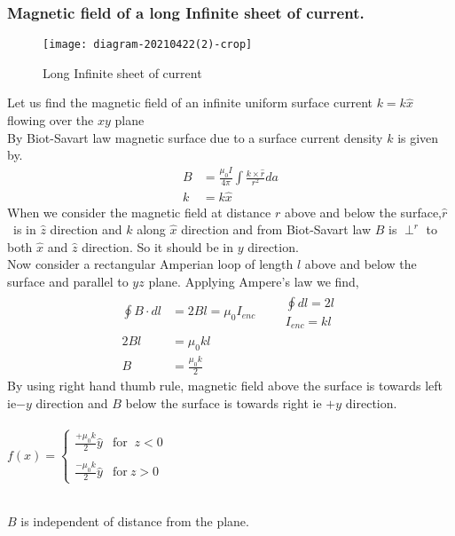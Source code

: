 \subsubsection{Magnetic field of a long Infinite sheet of current. }
\begin{wrapfigure}{r}{0.30\textwidth}
	\begin{center}
		\texttt{[image: diagram-20210422(2)-crop]}
	\end{center}
	\caption{Long Infinite sheet of current}
\end{wrapfigure}
Let us find the magnetic field of an infinite uniform surface current $k=k\hat{x}$ flowing over the $xy$ plane\\
By Biot-Savart law magnetic surface due to a surface current density $k$ is given by.
	\begin{align*}
	B&=\frac{\mu_0 I}{4\pi}\int\frac{k\times \hat{r}}{r^2}da\\
	k&=k\hat{x} 
	\end{align*}
When we consider the magnetic field at distance $r$ above and below the surface,$\hat{r}$\ is in $\hat{z}$ direction and $k$ along $\hat{x}$ direction and from Biot-Savart law $B$ is $\perp^r$ to both $\hat{x}$ and $\hat{z}$ direction. So it should be in $y$ direction.\\
Now consider a rectangular Amperian loop of length $l$ above and below the surface and parallel to $yz$ plane. Applying Ampere's law we find,
\begin{align*}
\oint B \cdot dl&=2Bl=\mu_0 I_{enc} \qquad\begin{array}{l}
\oint dl=2l \\
I{_{enc}=kl}
\end{array}\\
2Bl&=\mu_0kl\\
B&=\frac{\mu_0k}{2}
\end{align*}
By using right hand thumb rule, magnetic field above the surface is towards left ie$-y$ direction and $B$ below the surface is towards right ie $+y$ direction.\\\\
$f(x)= 
\begin{cases}
\frac{+\mu_0 k}{2}\hat{y}& \text{for }\ z<0\\\\
 \frac{-\mu_0 k}{2}\hat{y} & \text{for}\ z>0
\end{cases}$
\begin{note}\\
	$B$ is independent of distance from the plane.
\end{note}
